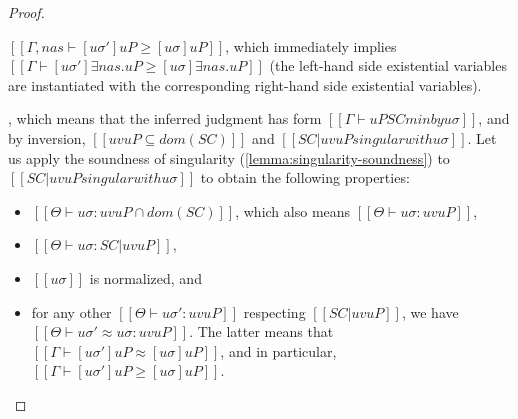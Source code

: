 \begin{proof}
\begin{caseof}
\begin{itemize}
                    $[[Γ, nas ⊢ [uσ']uP ≥ [uσ]uP ]]$, which immediately implies 
                    $[[Γ ⊢ [uσ']∃nas.uP ≥ [uσ]∃nas.uP ]]$ (the left-hand side
                    existential variables are instantiated with the corresponding 
                    right-hand side existential variables).
            \end{itemize}
        \item {}, which means that
            the inferred judgment has form $[[Γ ⊢ uP SC minby uσ]]$,
            and by inversion, $[[uv uP ⊆ dom(SC)]]$ and
            $[[SC|uv uP singular with uσ]]$. Let us apply the soundness of singularity
            (\cref{lemma:singularity-soundness}) to $[[SC|uv uP singular with uσ]]$ to
            obtain the following properties:
            \begin{itemize}
                \item $[[ Θ ⊢ uσ : uv uP ∩ dom(SC) ]]$, which also means 
                    $[[Θ ⊢ uσ : uv uP]]$,
                \item $[[Θ ⊢ uσ : SC|uv uP]]$,
                \item $[[uσ]]$ is normalized, and
                \item for any other $[[Θ ⊢ uσ' : uv uP ]]$
                    respecting $[[SC|uv uP]]$, we have
                    $[[Θ ⊢ uσ' ≈ uσ : uv uP]]$. The latter means that
                    $[[Γ ⊢ [uσ']uP ≈ [uσ]uP]]$, and in particular, 
                    $[[Γ ⊢ [uσ']uP ≥ [uσ]uP]]$.
            \end{itemize}
    \end{caseof}

\end{proof}

